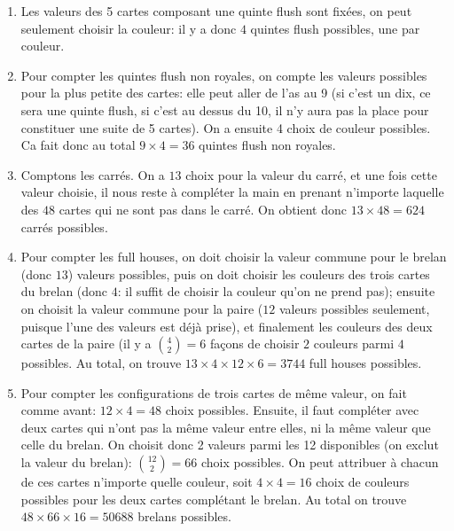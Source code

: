 \begin{exo}
\begin{sol}
\begin{enumerate}
\item Les valeurs des 5 cartes composant une quinte flush sont fixées, on peut seulement choisir la couleur: il y a donc $4$ quintes flush possibles, une par couleur. 

\item Pour compter les quintes flush non royales, on compte les valeurs possibles pour la plus petite des cartes: elle peut aller de l'as au 9 (si c'est un dix, ce sera une quinte flush, si c'est au dessus du 10, il n'y aura pas la place pour constituer une suite de 5 cartes). On a ensuite 4 choix de couleur possibles. Ca fait donc au total $9 \times 4=36$ quintes flush non royales. 

\item Comptons les carrés. On a $13$ choix pour la valeur du carré, et une fois cette valeur choisie, il nous reste à compléter la main en prenant n'importe laquelle des $48$ cartes qui ne sont pas dans le carré. On obtient donc $13\times 48=624$ carrés possibles.

\item Pour compter les full houses, on doit choisir la valeur commune pour le brelan (donc $13$) valeurs possibles, puis on doit choisir les couleurs des trois cartes du brelan (donc $4$: il suffit de choisir la couleur qu'on ne prend pas); ensuite on choisit la valeur commune pour la paire ($12$ valeurs possibles seulement, puisque l'une des valeurs est déjà prise), et finalement les couleurs des deux cartes de la paire (il y a ${4 \choose 2}=6$ façons de choisir $2$ couleurs parmi $4$ possibles. Au total, on trouve $13\times4\times 12 \times 6=3744$ full houses possibles. 

\item Pour compter les configurations de trois cartes de même valeur, on fait comme avant: $12\times 4=48$ choix possibles. Ensuite, il faut compléter avec deux cartes qui n'ont pas la même valeur entre elles, ni la même valeur que celle du brelan. On choisit donc 2 valeurs parmi les 12 disponibles (on exclut la valeur du brelan): ${12 \choose 2}=66$ choix possibles. On peut attribuer à chacun de ces cartes n'importe quelle couleur, soit $4\times 4=16$ choix de couleurs possibles pour les deux cartes complétant le brelan. Au total on trouve $48 \times 66 \times 16=50688$ brelans possibles. 
\end{enumerate}
\end{sol}
\end{exo}

